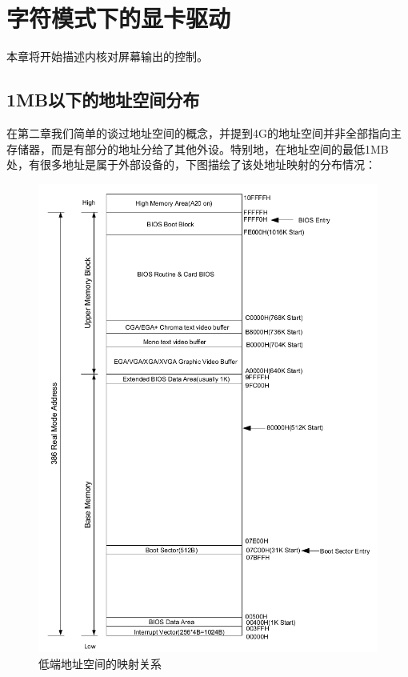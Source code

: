 
\section {字符模式下的显卡驱动}

\par 本章将开始描述内核对屏幕输出的控制。

\subsection{1MB以下的地址空间分布}

\par 在第二章我们简单的谈过地址空间的概念，并提到4G的地址空间并非全部指向主存储器，而是有部分的地址分给了其他外设。特别地，在地址空间的最低1MB处，有很多地址是属于外部设备的，下图描绘了该处地址映射的分布情况：

\begin{figure}[ht]
      \centering
      \includegraphics[scale=0.65]{picture/chapt4/BIOS-mem.png}
      \caption{低端地址空间的映射关系}
\end{figure}


